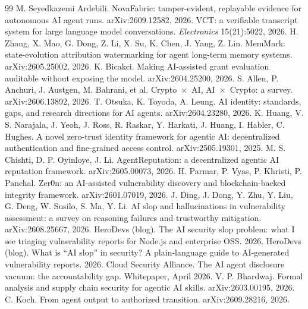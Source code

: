 \documentclass[11pt]{article}
\begin{document}
\begin{thebibliography}{99}
 M. Seyedkazemi Ardebili. NovaFabric: tamper-evident, replayable evidence for autonomous AI agent runs. arXiv:2609.12582, 2026.
 VCT: a verifiable transcript system for large language model conversations. \emph{Electronics} 15(21):5022, 2026.
 H. Zhang, X. Mao, G. Dong, Z. Li, X. Su, K. Chen, J. Yang, Z. Lin. MemMark: state-evolution attribution watermarking for agent long-term memory systems. arXiv:2605.25002, 2026.
 K. Bicakci. Making AI-assisted grant evaluation auditable without exposing the model. arXiv:2604.25200, 2026.
 S. Allen, P. Anchuri, J. Austgen, M. Bahrani, et al. Crypto~$\times$~AI, AI~$\times$~Crypto: a survey. arXiv:2606.13892, 2026.
 T. Otsuka, K. Toyoda, A. Leung. AI identity: standards, gaps, and research directions for AI agents. arXiv:2604.23280, 2026.
 K. Huang, V. S. Narajala, J. Yeoh, J. Ross, R. Raskar, Y. Harkati, J. Huang, I. Habler, C. Hughes. A novel zero-trust identity framework for agentic AI: decentralized authentication and fine-grained access control. arXiv:2505.19301, 2025.
 M. S. Chishti, D. P. Oyinloye, J. Li. AgentReputation: a decentralized agentic AI reputation framework. arXiv:2605.00073, 2026.
 H. Parmar, P. Vyas, P. Khristi, P. Panchal. Zer0n: an AI-assisted vulnerability discovery and blockchain-backed integrity framework. arXiv:2601.07019, 2026.
 J. Ding, J. Dong, Y. Zhu, Y. Liu, G. Deng, W. Susilo, S. Ma, Y. Li. AI slop and hallucinations in vulnerability assessment: a survey on reasoning failures and trustworthy mitigation. arXiv:2608.25667, 2026.
 HeroDevs (blog). The AI security slop problem: what I see triaging vulnerability reports for Node.js and enterprise OSS. 2026.
 HeroDevs (blog). What is ``AI slop'' in security? A plain-language guide to AI-generated vulnerability reports. 2026.
 Cloud Security Alliance. The AI agent disclosure vacuum: the accountability gap. Whitepaper, April 2026.
 V. P. Bhardwaj. Formal analysis and supply chain security for agentic AI skills. arXiv:2603.00195, 2026.
 C. Koch. From agent output to authorized transition. arXiv:2609.28216, 2026.
\end{thebibliography}
\end{document}
